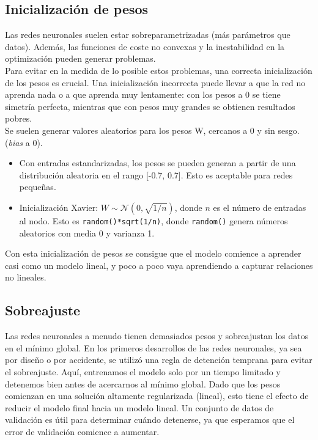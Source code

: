 \subsection{Inicialización de pesos}

Las redes neuronales suelen estar sobreparametrizadas (más parámetros que datos). Además, las funciones de coste no convexas y la inestabilidad en la optimización pueden generar problemas. \\

Para evitar en la medida de lo posible estos problemas, una correcta inicialización de los pesos es crucial. Una inicialización incorrecta puede llevar a que la red no aprenda nada o a que aprenda muy lentamente: con los pesos a 0 se tiene simetría perfecta, mientras que con pesos muy grandes se obtienen resultados pobres. \\

\noindent Se suelen generar valores aleatorios para los pesos W, cercanos a 0 y sin sesgo. (\textit{bias} a 0). 
\begin{itemize}
\item Con entradas estandarizadas, los pesos se pueden generan a partir de una distribución aleatoria en el rango [-0.7, 0.7]. Esto es aceptable para redes pequeñas.
\item Inicialización Xavier: $W \sim \mathcal{N}(0, \sqrt{1/n})$, donde $n$ es el número de entradas al nodo. Esto es \texttt{random()*sqrt(1/n)}, donde \texttt{random()} genera números aleatorios con media 0 y varianza 1.
\end{itemize}

Con esta inicialización de pesos se consigue que el modelo comience a aprender casi como un modelo lineal, y poco a poco vaya aprendiendo a capturar relaciones no lineales. 

\subsection{Sobreajuste}

Las redes neuronales a menudo tienen demasiados pesos y sobreajustan los datos en el mínimo global. En los primeros desarrollos de las redes neuronales, ya sea por diseño o por accidente, se utilizó una regla de detención temprana para evitar el sobreajuste. Aquí, entrenamos el modelo solo por un tiempo limitado y detenemos bien antes de acercarnos al mínimo global. Dado que los pesos comienzan en una solución altamente regularizada (lineal), esto tiene el efecto de reducir el modelo final hacia un modelo lineal. Un conjunto de datos de validación es útil para determinar cuándo detenerse, ya que esperamos que el error de validación comience a aumentar. \\

